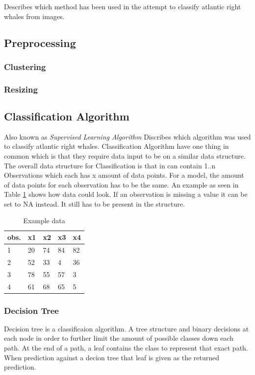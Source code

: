 Describes which method has been used in the attempt to classify atlantic right whales from images.

\subsection{Preprocessing}


\subsubsection{Clustering}


\subsubsection{Resizing}


\subsection{Classification Algorithm}
Also known as \emph{Supervised Learning Algorithm}
Discribes which algorithm was used to classify atlantic right whales. Classification Algorithm have one thing in common which is that they require data input to be on a similar data structure.
The overall data structure for Classification is that in can contain 1..n Observations which each has x amount of data points. For a model, the amount of data points for each observation has to be the same. An example as seen in Table \ref{tab:example data} shows how data could look.
If an observation is missing a value it can be set to NA instead. It still has to be present in the structure.

\begin{table}
  \centering
  \caption{Example data}
  \label{tab:example data}
  \begin{tabularx}{\linewidth}{|l|X|X|X|X|} \hline
    obs. & x1 & x2 & x3 & x4 \\ \hline
    1    & 20 & 74 & 84 & 82 \\ \hline
    2    & 52 & 33 & 4  & 36 \\ \hline
    3    & 78 & 55 & 57 & 3  \\ \hline
    4    & 61 & 68 & 65 & 5  \\ \hline
  \end{tabularx}
\end{table}

\subsubsection{Decision Tree}
Decision tree is a classificaion algorithm. A tree structure and binary decisions at each node in order to further limit the amount of possible classes down each path.
At the end of a path, a leaf contains the class to represent that exact path.
When prediction against a decion tree that leaf is given as the returned prediction.

